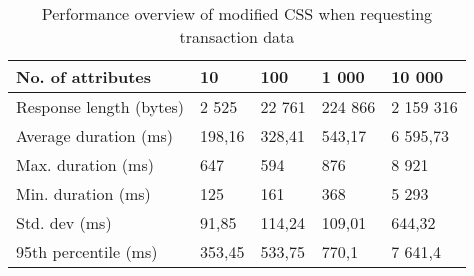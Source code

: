 \begin{table}[H]
\begin{subtable}{1.0\textwidth}
\centering
\begin{tabular}{lllll}
\textbf{No. of attributes} & \multicolumn{1}{l}{\textbf{10}} & \multicolumn{1}{l}{\textbf{100}} & \multicolumn{1}{l}{\textbf{1 000}} & \multicolumn{1}{l}{\textbf{10 000}} \\ \hline
Response length (bytes)    & 2 525                           & 22 761                           & 224 866                            & 2 159 316                           \\
Average duration (ms)      & 198,16                          & 328,41                           & 543,17                             & 6 595,73                            \\
Max. duration (ms)         & 647                             & 594                              & 876                                & 8 921                               \\
Min. duration (ms)         & 125                             & 161                              & 368                                & 5 293                               \\
Std. dev (ms)              & 91,85                           & 114,24                           & 109,01                             & 644,32                              \\
95th percentile (ms)       & 353,45                          & 533,75                           & 770,1                              & 7 641,4                            
\end{tabular}
\caption{Performance overview of modified \acrshort{CSS} when requesting transaction data}
\label{table:results-modified-json}
\end{subtable}

\vspace*{0.5 cm}


\end{table}
